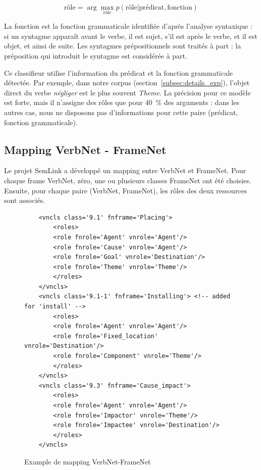 $$ \text{rôle} = \arg\max_{\text{rôle}} p(\text{rôle} \vert \text{prédicat}, \text{fonction})$$

La fonction est la fonction grammaticale identifiée d'après l'analyse
syntaxique : si un syntagme apparaît avant le verbe, il est sujet, s'il est
après le verbe, et il est objet, et ainsi de suite. Les syntagmes
prépositionnels sont traités à part : la préposition qui introduit le syntagme
est considérée à part.

Ce classifieur utilise l'information du prédicat et la fonction grammaticale
détectée. Par exemple, dans notre corpus (section~\ref{subsec:details_exp}),
l'objet direct du verbe \emph{négliger} est le plus souvent \emph{Theme}. La
précision pour ce modèle est forte, mais il n'assigne des rôles que pour 40~\%
des arguments : dans les autres cas, nous ne disposons pas d'informations pour
cette paire (prédicat, fonction grammaticale).

\subsection{Mapping VerbNet - FrameNet}
\label{subsec:mapping}

Le projet SemLink a développé un mapping entre VerbNet et FrameNet. Pour chaque
frame VerbNet, zéro, une ou plusieurs classes FrameNet ont été choisies.
Ensuite, pour chaque paire (VerbNet, FrameNet), les rôles des deux ressources
sont associés.

\begin{figure}[ht]
    \begin{verbatim}
    <vncls class='9.1' fnframe='Placing'>
        <roles>
        <role fnrole='Agent' vnrole='Agent'/>
        <role fnrole='Cause' vnrole='Agent'/>
        <role fnrole='Goal' vnrole='Destination'/>
        <role fnrole='Theme' vnrole='Theme'/>
        </roles>
    </vncls>
    <vncls class='9.1-1' fnframe='Installing'> <!-- added for 'install' -->
        <roles>
        <role fnrole='Agent' vnrole='Agent'/>
        <role fnrole='Fixed_location' vnrole='Destination'/>
        <role fnrole='Component' vnrole='Theme'/>
        </roles>
    </vncls>
    <vncls class='9.3' fnframe='Cause_impact'>
        <roles>
        <role fnrole='Agent' vnrole='Agent'/>
        <role fnrole='Impactor' vnrole='Theme'/>
        <role fnrole='Impactee' vnrole='Destination'/>
        </roles>
    </vncls>
    \end{verbatim}
    \caption{\label{fig:mapping}Example de mapping VerbNet-FrameNet}
\end{figure}

